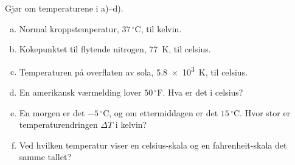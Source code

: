 %
Gjør om temperaturene i a)--d).
\begin{enumerate}[a)]
    \item Normal kroppstemperatur, $37\,^\circ$C, til kelvin.
    \item Kokepunktet til flytende nitrogen, \SI{77}{\kelvin}, til celsius.
    \item Temperaturen på overflaten av sola, \SI{5.8e3}{\kelvin}, til celsius.
    \item En amerikansk værmelding lover $50\,^\circ$F. Hva er det i celsius?
    \item En morgen er det $-5\,^\circ$C, og om ettermiddagen er det $15\,^\circ$C. Hvor stor er temperaturendringen $\Delta T$ i kelvin?
    \item Ved hvilken temperatur viser en celsius-skala og en fahrenheit-skala det samme tallet?
\end{enumerate}
%

